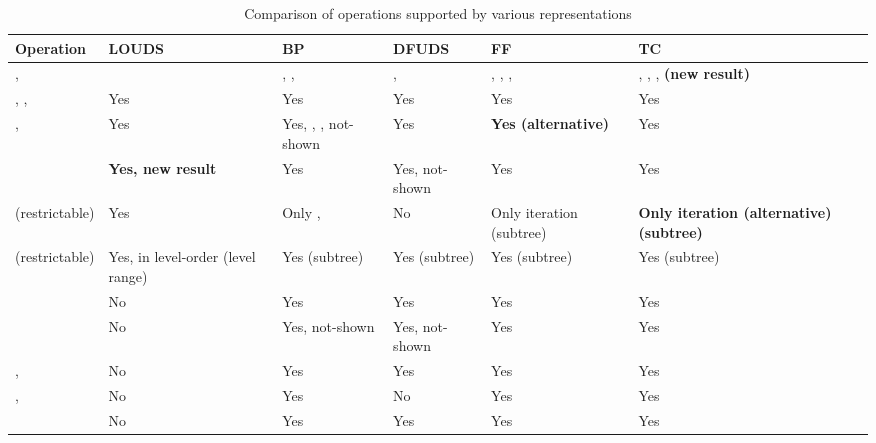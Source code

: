 \begin{sidewaystable}
	\centering
	\begin{tabularx}{\textwidth}{|L{1}||L{1}|L{1}|L{1}|L{1}|L{1}|}
		\hline
		Operation
		& LOUDS
		& BP
		& DFUDS
		& FF
		& TC
		\\ \hline \hline

		\anyRank{}, \newline
		\anySelect{}
		& \loAny{}
		& \preAny{}, \postAny{}, \inAny{}
		& \preAny{}, \dfudsAny{}
		& \preAny{}, \postAny{}, \dfudsAny{}, \inAny{}
		& \preAny{}, \postAny{}, \dfudsAny{}, \textbf{\inAny{} (new result)}
		\\ \hline
		
		\parent{}, \isRoot{}, \isLeaf{}
		& Yes
		& Yes
		& Yes
		& Yes
		& Yes
		\\ \hline
		
		\childAny{}, \degree{}
		& Yes
		& Yes, \childRank{}, \childSelect{}, \degree{} not-shown
		& Yes
		& \textbf{Yes (alternative)}
		& Yes
		\\ \hline
		
		\dep{}
		& \textbf{Yes, new result}
		& Yes
		& Yes, not-shown
		& Yes
		& Yes
		\\ \hline
	
		\levelAny{} (restrictable)
		& Yes
		& Only \levelPrev{}, \levelNext{}
		& No
		& Only iteration (subtree)
		& \textbf{Only iteration (alternative) (subtree)}
		\\ \hline
		
		\leafAny{} (restrictable)
		& Yes, in level-order (level range)
		& Yes (subtree)
		& Yes (subtree)
		& Yes (subtree)
		& Yes (subtree)
		\\ \hline
		
		\isAncestor{}
		& No
		& Yes
		& Yes
		& Yes
		& Yes
		\\ \hline
		
		\levelAncestor{}
		& No
		& Yes, not-shown
		& Yes, not-shown
		& Yes
		& Yes
		\\ \hline
		
		\lca{}, \distance{}
		& No
		& Yes
		& Yes
		& Yes
		& Yes
		\\ \hline
		
		\hei{}, \deepestVertex{}
		& No
		& Yes
		& No
		& Yes
		& Yes
		\\ \hline
		
		\subtreeSize{}
		& No
		& Yes
		& Yes
		& Yes
		& Yes
		\\ \hline
	\end{tabularx}
	\caption{Comparison of operations supported by various representations}
	\label{tab:comparison}
\end{sidewaystable}


